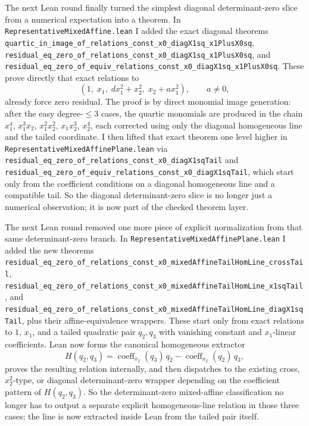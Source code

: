 \documentclass[11pt]{article}
\begin{document}
The next Lean round finally turned the simplest diagonal determinant-zero slice
from a numerical expectation into a theorem. In
\texttt{RepresentativeMixedAffine.lean} I added the exact diagonal theorems
\texttt{quartic\_in\_image\_of\_relations\_const\_x0\_diagX1sq\_x1PlusX0sq},
\texttt{residual\_eq\_zero\_of\_relations\_const\_x0\_diagX1sq\_x1PlusX0sq},
and
\texttt{residual\_eq\_zero\_of\_equiv\_relations\_const\_x0\_diagX1sq\_x1PlusX0sq}.
These prove directly that exact relations to
\[
  (1,\;x_1,\; d x_1^2 + x_2^2,\; x_2 + a x_1^2), \qquad a \neq 0,
\]
already force zero residual. The proof is by direct monomial image generation:
after the easy degree-\(\le 3\) cases, the quartic monomials are produced in
the chain \(x_1^4\), \(x_1^3x_2\), \(x_1^2x_2^2\), \(x_1x_2^3\), \(x_2^4\),
each corrected using only the diagonal homogeneous line and the tailed
coordinate. I then lifted that exact theorem one level higher in
\texttt{RepresentativeMixedAffinePlane.lean} via
\texttt{residual\_eq\_zero\_of\_relations\_const\_x0\_diagX1sqTail} and
\texttt{residual\_eq\_zero\_of\_equiv\_relations\_const\_x0\_diagX1sqTail},
which start only from the coefficient conditions on a diagonal homogeneous
line and a compatible tail. So the diagonal determinant-zero slice is no longer
just a numerical observation; it is now part of the checked theorem layer.

The next Lean round removed one more piece of explicit normalization from that
same determinant-zero branch. In
\texttt{RepresentativeMixedAffinePlane.lean} I added the new theorems
\texttt{residual\_eq\_zero\_of\_relations\_const\_x0\_mixedAffineTailHomLine\_crossTail},
\texttt{residual\_eq\_zero\_of\_relations\_const\_x0\_mixedAffineTailHomLine\_x1sqTail},
and
\texttt{residual\_eq\_zero\_of\_relations\_const\_x0\_mixedAffineTailHomLine\_diagX1sqTail},
plus their affine-equivalence wrappers. These start only from exact relations
to \(1\), \(x_1\), and a tailed quadratic pair \(q_2,q_3\) with vanishing
constant and \(x_1\)-linear coefficients. Lean now forms the canonical
homogeneous extractor
\[
  H(q_2,q_3)
  =
  \operatorname{coeff}_{x_2}(q_3)\,q_2
  -
  \operatorname{coeff}_{x_2}(q_2)\,q_3,
\]
proves the resulting relation internally, and then dispatches to the existing
cross, \(x_2^2\)-type, or diagonal determinant-zero wrapper depending on the
coefficient pattern of \(H(q_2,q_3)\). So the determinant-zero mixed-affine
classification no longer has to output a separate explicit homogeneous-line
relation in those three cases; the line is now extracted inside Lean from the
tailed pair itself.
\end{document}

